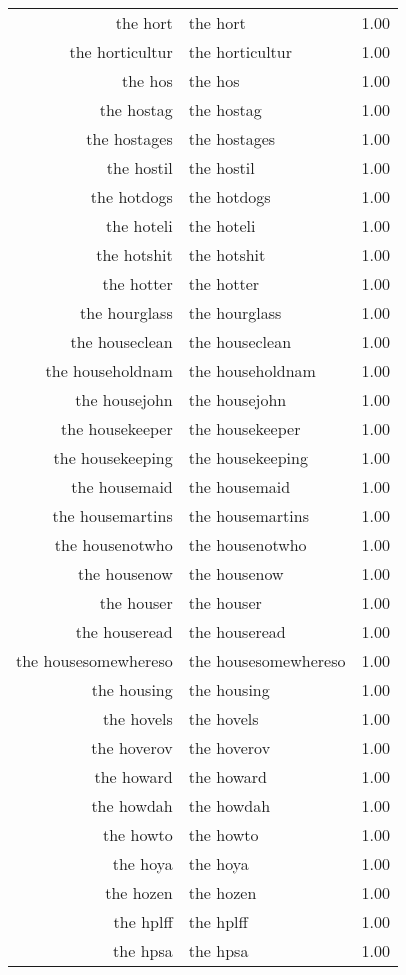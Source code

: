 \begin{table}[ht]
\begin{tabular}{rlr}
  the hort & the hort & 1.00 \\ 
  the horticultur & the horticultur & 1.00 \\ 
  the hos & the hos & 1.00 \\ 
  the hostag & the hostag & 1.00 \\ 
  the hostages & the hostages & 1.00 \\ 
  the hostil & the hostil & 1.00 \\ 
  the hotdogs & the hotdogs & 1.00 \\ 
  the hoteli & the hoteli & 1.00 \\ 
  the hotshit & the hotshit & 1.00 \\ 
  the hotter & the hotter & 1.00 \\ 
  the hourglass & the hourglass & 1.00 \\ 
  the houseclean & the houseclean & 1.00 \\ 
  the householdnam & the householdnam & 1.00 \\ 
  the housejohn & the housejohn & 1.00 \\ 
  the housekeeper & the housekeeper & 1.00 \\ 
  the housekeeping & the housekeeping & 1.00 \\ 
  the housemaid & the housemaid & 1.00 \\ 
  the housemartins & the housemartins & 1.00 \\ 
  the housenotwho & the housenotwho & 1.00 \\ 
  the housenow & the housenow & 1.00 \\ 
  the houser & the houser & 1.00 \\ 
  the houseread & the houseread & 1.00 \\ 
  the housesomewhereso & the housesomewhereso & 1.00 \\ 
  the housing & the housing & 1.00 \\ 
  the hovels & the hovels & 1.00 \\ 
  the hoverov & the hoverov & 1.00 \\ 
  the howard & the howard & 1.00 \\ 
  the howdah & the howdah & 1.00 \\ 
  the howto & the howto & 1.00 \\ 
  the hoya & the hoya & 1.00 \\ 
  the hozen & the hozen & 1.00 \\ 
  the hplff & the hplff & 1.00 \\ 
  the hpsa & the hpsa & 1.00 \\ 

\end{tabular}
\end{table}
